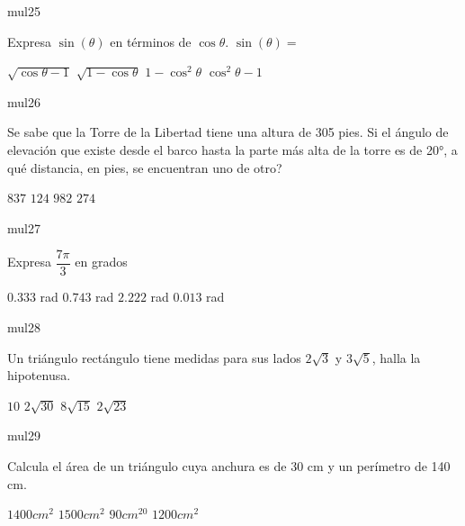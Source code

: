 \documentclass[a4paper]{article}
\begin{document}
\begin{question}{mul25}
    
Expresa \(\sin{(\theta)} \) en términos de \(\cos{\theta}\). \(\sin{(\theta)} = \)

\begin{choices}
       \choice $\sqrt{\cos{\theta} - 1}$
       \choice $\sqrt{1 - \cos{\theta}}$
       \choice $1 - {\cos^2{\theta} }$
       \choice $\cos^{2}{\theta} - 1$
\end{choices}
\end{question}

\begin{question}{mul26}
            
Se sabe que la Torre de la Libertad tiene una altura de 305 pies. Si el ángulo de elevación que existe desde el barco hasta la parte más alta de la torre es de 20°, a qué distancia, en pies, se encuentran uno de otro?


 \begin{choices}
            \choice $837$ 
            \choice $124$ 
            \choice $982$
            \choice $274$
 \end{choices}
\end{question}

\begin{question}{mul27}
            

Expresa \(\dfrac{7\pi}{3}\) en grados

\begin{choices}
    \choice $0.333$ rad
      \choice $0.743$ rad
      \choice $2.222$ rad
     \choice $0.013$ rad
\end{choices}
\end{question}

\begin{question}{mul28}


Un triángulo rectángulo tiene medidas para sus lados \(2\sqrt{3}\) y \(3\sqrt{5}\), halla la hipotenusa.

\begin{choices}
   \choice $10$ 
    \choice $2\sqrt{30}$
    \choice $8\sqrt{15}$
   \choice $2\sqrt{23}$
\end{choices}
\end{question}

\begin{question}{mul29}


Calcula el área de un triángulo cuya anchura es de 30 cm y un perímetro de 140 cm.    

\begin{choices}
    \choice $1400 cm^2$
    \choice $1500  cm^2$
    \choice $90  cm^20$
   \choice $1200  cm^2$
\end{choices}

\end{question}
\end{document}
